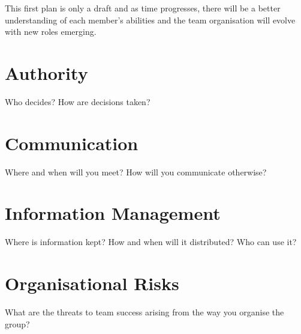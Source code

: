 \documentclass{article}
\begin{document}
This first plan is only a draft and as time progresses, there will be a better understanding of each member's abilities and the team organisation will evolve with new roles emerging. 


\section{Authority}
\label{auth}


Who decides?  How are decisions taken?


\section{Communication}

Where and when will you meet?  How will you communicate otherwise?


\section{Information Management}

Where is information kept?  How and when will it distributed?  Who can
use it?


\section{Organisational Risks}

What are the threats to team success arising from the way you organise
the group?




\end{document}
